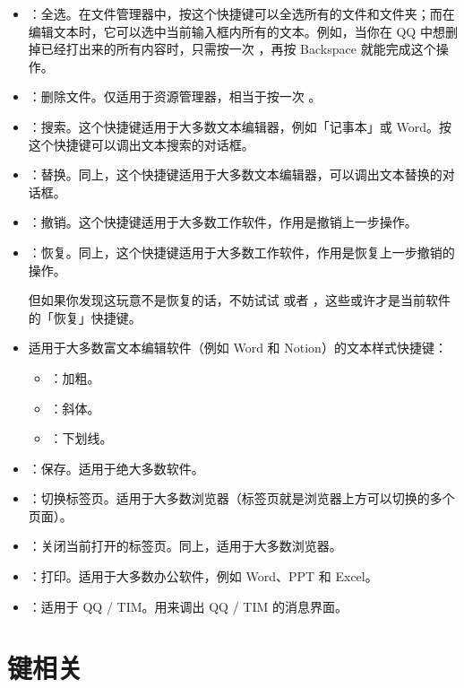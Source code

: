 \begin{itemize}
  \item {}：全选。在文件管理器中，按这个快捷键可以全选所有的文件和文件夹；而在编辑文本时，它可以选中当前输入框内所有的文本。例如，当你在 QQ 中想删掉已经打出来的所有内容时，只需按一次 ，再按 Backspace 就能完成这个操作。
  \item {}：删除文件。仅适用于资源管理器，相当于按一次 。
  \item {}：搜索。这个快捷键适用于大多数文本编辑器，例如「记事本」或 Word。按这个快捷键可以调出文本搜索的对话框。
  \item {}：替换。同上，这个快捷键适用于大多数文本编辑器，可以调出文本替换的对话框。
  \item {}：撤销。这个快捷键适用于大多数工作软件，作用是撤销上一步操作。
  \item {}：恢复。同上，这个快捷键适用于大多数工作软件，作用是恢复上一步撤销的操作。
  
  但如果你发现这玩意不是恢复的话，不妨试试  或者 ，这些或许才是当前软件的「恢复」快捷键。

  \item 适用于大多数富文本编辑软件（例如 Word 和 Notion）的文本样式快捷键：
  \begin{itemize}
    \item {}：加粗。
    \item {}：斜体。
    \item {}：下划线。
  \end{itemize}
  \item {}：保存。适用于绝大多数软件。
  \item {}：切换标签页。适用于大多数浏览器（标签页就是浏览器上方可以切换的多个页面）。
  \item {}：关闭当前打开的标签页。同上，适用于大多数浏览器。
  \item {}：打印。适用于大多数办公软件，例如 Word、PPT 和 Excel。
  \item {}：适用于 QQ / TIM。用来调出 QQ / TIM 的消息界面。
\end{itemize}

\section{ 键相关}

